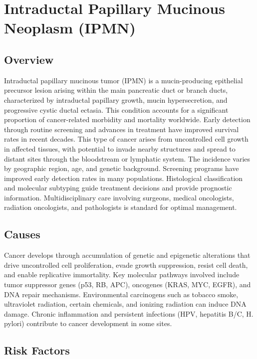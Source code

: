 \chapter{Intraductal Papillary Mucinous Neoplasm (IPMN)}
\label{sec:Intraductal Papillary Mucinous Neoplasm (IPMN)}

\section{Overview}
Intraductal papillary mucinous tumor (IPMN) is a mucin-producing epithelial precursor lesion arising within the main pancreatic duct or branch ducts, characterized by intraductal papillary growth, mucin hypersecretion, and progressive cystic ductal ectasia. This condition accounts for a significant proportion of cancer-related morbidity and mortality worldwide. Early detection through routine screening and advances in treatment have improved survival rates in recent decades. This type of cancer arises from uncontrolled cell growth in affected tissues, with potential to invade nearby structures and spread to distant sites through the bloodstream or lymphatic system. The incidence varies by geographic region, age, and genetic background. Screening programs have improved early detection rates in many populations. Histological classification and molecular subtyping guide treatment decisions and provide prognostic information. Multidisciplinary care involving surgeons, medical oncologists, radiation oncologists, and pathologists is standard for optimal management.
\section{Causes}
Cancer develops through accumulation of genetic and epigenetic alterations that drive uncontrolled cell proliferation, evade growth suppression, resist cell death, and enable replicative immortality. Key molecular pathways involved include tumor suppressor genes (p53, RB, APC), oncogenes (KRAS, MYC, EGFR), and DNA repair mechanisms. Environmental carcinogens such as tobacco smoke, ultraviolet radiation, certain chemicals, and ionizing radiation can induce DNA damage. Chronic inflammation and persistent infections (HPV, hepatitis B/C, H. pylori) contribute to cancer development in some sites.
\section{Risk Factors}

